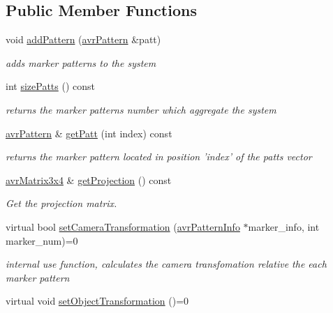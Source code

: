 \subsection*{Public Member Functions}
\begin{DoxyCompactItemize}
\item 
void \hyperlink{classavr_system_marker_ada81a1258d8718041130f8256f127b82}{add\-Pattern} (\hyperlink{classavr_pattern}{avr\-Pattern} \&patt)
\begin{DoxyCompactList}\small\item\em adds marker patterns to the system \end{DoxyCompactList}\item 
\hypertarget{classavr_system_marker_a8bd7531b62e628f53aca79934cc3cbe4}{int \hyperlink{classavr_system_marker_a8bd7531b62e628f53aca79934cc3cbe4}{size\-Patts} () const }\label{classavr_system_marker_a8bd7531b62e628f53aca79934cc3cbe4}

\begin{DoxyCompactList}\small\item\em returns the marker patterns number which aggregate the system \end{DoxyCompactList}\item 
\hypertarget{classavr_system_marker_aca0f590142ff9d881d9d38b085b8eb0a}{\hyperlink{classavr_pattern}{avr\-Pattern} \& \hyperlink{classavr_system_marker_aca0f590142ff9d881d9d38b085b8eb0a}{get\-Patt} (int index) const }\label{classavr_system_marker_aca0f590142ff9d881d9d38b085b8eb0a}

\begin{DoxyCompactList}\small\item\em returns the marker pattern located in position 'index' of the patts vector \end{DoxyCompactList}\item 
\hypertarget{classavr_system_marker_a4169a0baae2d3574818b8ce1f5e5f613}{\hyperlink{classavr_matrix3x4}{avr\-Matrix3x4} \& \hyperlink{classavr_system_marker_a4169a0baae2d3574818b8ce1f5e5f613}{get\-Projection} () const }\label{classavr_system_marker_a4169a0baae2d3574818b8ce1f5e5f613}

\begin{DoxyCompactList}\small\item\em Get the projection matrix. \end{DoxyCompactList}\item 
virtual bool \hyperlink{classavr_system_marker_a565106c7110c5ffd5e9448d4b4349659}{set\-Camera\-Transformation} (\hyperlink{classavr_pattern_info}{avr\-Pattern\-Info} $\ast$marker\-\_\-info, int marker\-\_\-num)=0
\begin{DoxyCompactList}\small\item\em internal use function, calculates the camera transfomation relative the each marker pattern \end{DoxyCompactList}\item 
\hypertarget{classavr_system_marker_a7d1e0f3184871cc973a7e0e4ac0cdfa4}{virtual void \hyperlink{classavr_system_marker_a7d1e0f3184871cc973a7e0e4ac0cdfa4}{set\-Object\-Transformation} ()=0}\label{classavr_system_marker_a7d1e0f3184871cc973a7e0e4ac0cdfa4}


\end{DoxyCompactItemize}
